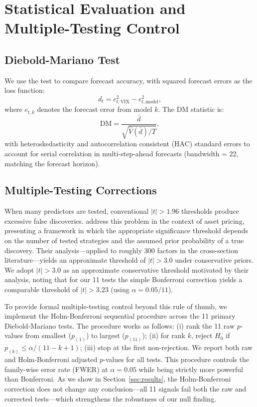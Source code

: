 \documentclass[12pt,a4paper]{article}
\begin{document}
\section{Statistical Evaluation and Multiple-Testing Control}
\label{sec:evaluation}

\subsection{Diebold-Mariano Test}

We use the \citet{diebold1995} test to compare forecast accuracy, with squared forecast errors as the loss function:
\begin{equation}
d_t = e_{t,\text{VIX}}^2 - e_{t,\text{model}}^2,
\label{eq:dm}
\end{equation}
where $e_{t,k}$ denotes the forecast error from model $k$. The DM statistic is:
\begin{equation}
\text{DM} = \frac{\bar{d}}{\sqrt{\hat{V}(\bar{d})/T}},
\label{eq:dm_stat}
\end{equation}
with \citet{newey1987} heteroskedasticity and autocorrelation consistent (HAC) standard errors to account for serial correlation in multi-step-ahead forecasts (bandwidth = 22, matching the forecast horizon).

\subsection{Multiple-Testing Corrections}
\label{sec:multiple_testing}

When many predictors are tested, conventional $|t| > 1.96$ thresholds produce excessive false discoveries. \citet{harvey2016} address this problem in the context of asset pricing, presenting a framework in which the appropriate significance threshold depends on the number of tested strategies and the assumed prior probability of a true discovery. Their analysis---applied to roughly 300 factors in the cross-section literature---yields an approximate threshold of $|t| > 3.0$ under conservative priors. We adopt $|t| > 3.0$ as an approximate conservative threshold motivated by their analysis, noting that for our 11 tests the simple Bonferroni correction yields a comparable threshold of $|t| > 3.23$ (using $\alpha = 0.05/11$).

To provide formal multiple-testing control beyond this rule of thumb, we implement the Holm-Bonferroni sequential procedure \citep{holm1979} across the 11 primary Diebold-Mariano tests. The procedure works as follows: (i) rank the 11 raw $p$-values from smallest ($p_{(1)}$) to largest ($p_{(11)}$); (ii) for rank $k$, reject $H_0$ if $p_{(k)} \leq \alpha / (11 - k + 1)$; (iii) stop at the first non-rejection. We report both raw and Holm-Bonferroni adjusted $p$-values for all tests. This procedure controls the family-wise error rate (FWER) at $\alpha = 0.05$ while being strictly more powerful than Bonferroni. As we show in Section~\ref{sec:results}, the Holm-Bonferroni correction does not change any conclusion---all 11 signals fail both the raw and corrected tests---which strengthens the robustness of our null finding.
\end{document}
